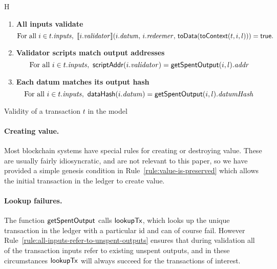 \begin{ruledfigure}{H}
\begin{enumerate}
\item
  \label{rule:all-inputs-validate}
  \textbf{All inputs validate}
  \begin{displaymath}
    \textrm{For all } i \in t.\mathit{inputs},\ \llbracket
    i.\mathit{validator}\rrbracket (i.\mathit{datum},\, i.\mathit{redeemer},\,  \mathsf{toData}(\mathsf{toContext}(t,i,l))) = \textsf{true}.
  \end{displaymath}

\item
  \label{rule:validator-scripts-hash}
  \textbf{Validator scripts match output addresses}
  \begin{displaymath}
    \textrm{For all } i \in t.\mathit{inputs},\ \mathsf{scriptAddr}(i.\mathit{validator}) = \mathsf{getSpentOutput}(i, l).\mathit{addr}
  \end{displaymath}

\item
  \label{rule:datums-hash}
  \textbf{Each datum matches its output hash}
  \begin{displaymath}
    \textrm{For all } i \in t.\inputs,\ \hashData(i.\datum) = \getSpent(i, l).\datumHsh
  \end{displaymath}

\end{enumerate}
\caption{Validity of a transaction $t$ in the \EUTXO{} model}
\label{fig:eutxo-validity}
\end{ruledfigure}
\vspace{-8mm}
\paragraph{Creating value.}
Most blockchain systems have special rules for creating or destroying value.
These are usually fairly idiosyncratic, and are not relevant to this paper, so
we have provided a simple genesis condition in
Rule~\ref{rule:value-is-preserved} which allows the initial transaction in the ledger
to create value.
\vspace{-1mm}
\paragraph{Lookup failures.}
The function $\mathsf{getSpentOutput}$ calls $\mathsf{lookupTx}$, which looks up the unique
transaction in the ledger with a particular id and can of course
fail. However Rule~\ref{rule:all-inputs-refer-to-unspent-outputs}
ensures that during validation all of the transaction inputs refer to
existing unspent outputs, and in these circumstances $\mathsf{lookupTx}$ will
always succeed for the transactions of interest.
